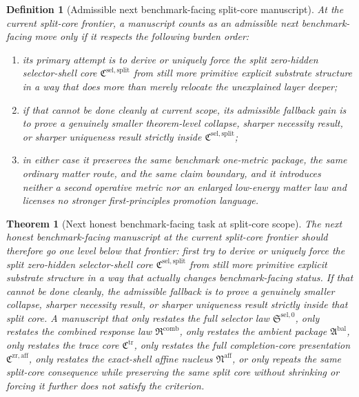 \documentclass[11pt]{article}
\newcommand{\CompletionCore}{\mathfrak C^{\mathrm{zr,aff}}}
\newcommand{\TraceCore}{\mathfrak C^{\mathrm{tr}}}
\newcommand{\AffineNucleus}{\mathfrak N^{\mathrm{aff}}}
\newcommand{\AmbientPackage}{\mathfrak A^{\mathrm{bal}}}
\newcommand{\CombinedLaw}{\mathfrak R^{\mathrm{comb}}}
\newcommand{\SelectorLaw}{\mathfrak S^{\mathrm{sel},0}}
\newcommand{\SelectorCore}{\mathfrak C^{\mathrm{sel,split}}}
\newtheorem{definition}{Definition}
\newtheorem{theorem}{Theorem}
\begin{document}
\begin{definition}[Admissible next benchmark-facing split-core manuscript]
At the current split-core frontier, a manuscript counts as an admissible next benchmark-facing move only if it respects the following burden order:
\begin{enumerate}
    \item its primary attempt is to derive or uniquely force the split zero-hidden selector-shell core \(\SelectorCore\) from still more primitive explicit substrate structure in a way that does more than merely relocate the unexplained layer deeper;
    \item if that cannot be done cleanly at current scope, its admissible fallback gain is to prove a genuinely smaller theorem-level collapse, sharper necessity result, or sharper uniqueness result strictly inside \(\SelectorCore\);
    \item in either case it preserves the same benchmark one-metric package, the same ordinary matter route, and the same claim boundary, and it introduces neither a second operative metric nor an enlarged low-energy matter law and licenses no stronger first-principles promotion language.
\end{enumerate}
\end{definition}

\begin{theorem}[Next honest benchmark-facing task at split-core scope]
The next honest benchmark-facing manuscript at the current split-core frontier should therefore go one level below that frontier: first try to derive or uniquely force the split zero-hidden selector-shell core \(\SelectorCore\) from still more primitive explicit substrate structure in a way that actually changes benchmark-facing status. If that cannot be done cleanly, the admissible fallback is to prove a genuinely smaller collapse, sharper necessity result, or sharper uniqueness result strictly inside that split core. A manuscript that only restates the full selector law \(\SelectorLaw\), only restates the combined response law \(\CombinedLaw\), only restates the ambient package \(\AmbientPackage\), only restates the trace core \(\TraceCore\), only restates the full completion-core presentation \(\CompletionCore\), only restates the exact-shell affine nucleus \(\AffineNucleus\), or only repeats the same split-core consequence while preserving the same split core without shrinking or forcing it further does not satisfy the criterion.
\end{theorem}
\end{document}
